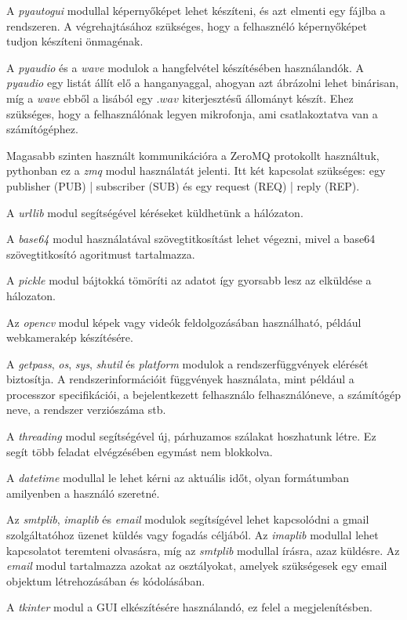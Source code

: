 \documentclass[12pt,a4paper,oneside]{report}
\begin{document}
A \emph{pyautogui} modullal képernyőképet lehet készíteni, és azt elmenti egy fájlba a rendszeren. A végrehajtásához szükséges, hogy a felhasznéló képernyőképet tudjon készíteni önmagénak.

A \emph{pyaudio} és a \emph{wave} modulok a hangfelvétel készítésében használandók. A \emph{pyaudio} egy listát állít elő a hanganyaggal, ahogyan azt ábrázolni lehet binárisan, míg a \emph{wave} ebből a lisából egy $.wav$ kiterjesztésű állományt készít. Ehez szükséges, hogy a felhasználónak legyen mikrofonja, ami csatlakoztatva van a számítógéphez.

Magasabb szinten használt kommunikációra a ZeroMQ protokollt használtuk, pythonban ez a \emph{zmq} modul használatát jelenti. Itt két kapcsolat szükséges: egy publisher (PUB) | subscriber (SUB) és egy request (REQ) | reply (REP).

A \emph{urllib} modul segítségével kéréseket küldhetünk a hálózaton.

A \emph{base64} modul használatával szövegtitkosítást lehet végezni, mivel a base64 szövegtitkosító agoritmust tartalmazza.

A \emph{pickle} modul bájtokká tömöríti az adatot így gyorsabb lesz az elküldése a hálozaton.

Az \emph{opencv} modul képek vagy videók feldolgozásában használható, például webkamerakép készítésére.

A \emph{getpass}, \emph{os}, \emph{sys}, \emph{shutil} és \emph{platform} modulok a rendszerfüggvények elérését biztosítja. A rendszerinformációit függvények használata, mint például a processzor specifikációi, a bejelentkezett felhasználo felhasználóneve, a számítógép neve, a rendszer verziószáma stb.

A \emph{threading} modul segítségével új, párhuzamos szálakat hoszhatunk létre. Ez segít több feladat elvégzésében egymást nem blokkolva.

A \emph{datetime} modullal le lehet kérni az aktuális időt, olyan formátumban amilyenben a használó szeretné.

Az \emph{smtplib}, \emph{imaplib} és \emph{email} modulok segítsígével lehet kapcsolódni a gmail szolgáltatóhoz üzenet küldés vagy fogadás céljából. Az \emph{imaplib} modullal lehet kapcsolatot teremteni olvasásra, míg az \emph{smtplib} modullal írásra, azaz küldésre. Az \emph{email} modul tartalmazza azokat az osztályokat, amelyek szükségesek egy email objektum létrehozásában és kódolásában.

A \emph{tkinter} modul a GUI elkészítésére használandó, ez felel a megjelenítésben.
\end{document}
